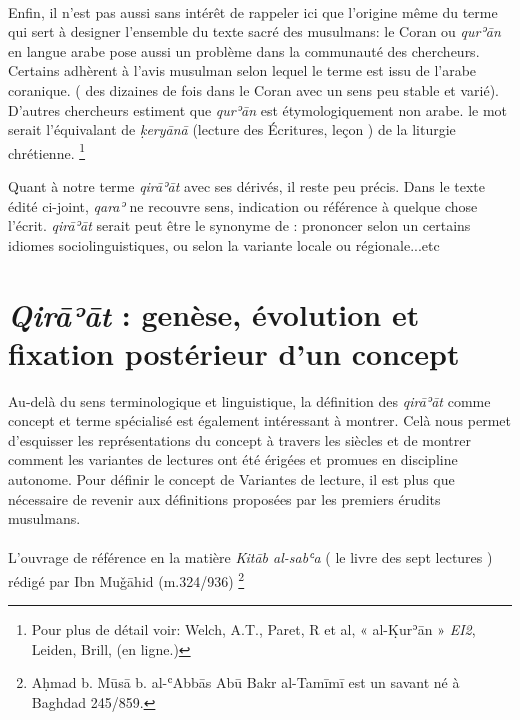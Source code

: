 \documentclass[a4paper,12pt]{report}
\begin{document}
\begin{itemize}
\paragraph{}
Enfin, il n'est pas aussi sans intérêt de rappeler ici  que  l'origine même du terme  qui sert  à designer l'ensemble du texte sacré des musulmans: le Coran ou  \textit{qurʾān } en langue arabe pose aussi un problème dans la communauté des chercheurs. Certains adhèrent à l'avis musulman selon lequel le terme est issu de l'arabe coranique. ( des dizaines de fois dans le Coran avec un sens peu stable et varié). D'autres chercheurs estiment que \textit{qurʾān } est étymologiquement non arabe. le mot  serait l'équivalant de \textit{ḳeryānā} (lecture des Écritures, leçon )    de la liturgie chrétienne. \footnote {Pour plus de détail voir: Welch, A.T., Paret, R et al, « al-Ḳurʾān » \textit{ EI2}, Leiden, Brill, (en ligne.)  }

Quant à notre terme \textit{qirāʾāt} avec ses dérivés, il reste peu précis.  Dans le texte édité ci-joint,  \textit{qaraʾ}   ne recouvre sens, indication  ou référence à quelque chose  l'écrit. \textit{qirāʾāt} serait peut être le synonyme de : prononcer selon  un certains idiomes sociolinguistiques,  ou selon la variante locale ou régionale...etc   

 \newpage
\section{ \textit{Qirāʾāt} : genèse, évolution et fixation postérieur d’un concept  }


Au-delà du sens terminologique et linguistique, la définition des\textit{ qirāʾāt} comme concept et terme spécialisé est également intéressant à montrer. Celà nous permet d’esquisser les représentations du concept à travers les siècles et de montrer comment les variantes de lectures ont été érigées et promues en discipline autonome.  Pour définir le concept de Variantes 
de lecture, il est plus que nécessaire de revenir aux définitions proposées par les premiers érudits musulmans. 

\paragraph{}
L'ouvrage de référence  en la matière \textit{Kitāb al-sabʿa} ( le livre des sept lectures )  rédigé par Ibn Muǧāhid  (m.324/936) \footnote{Aḥmad b. Mūsā b. al-ʿAbbās Abū Bakr al-Tamīmī  est un savant né à Baghdad 245/859.

}
\end{itemize}
\end{document}
